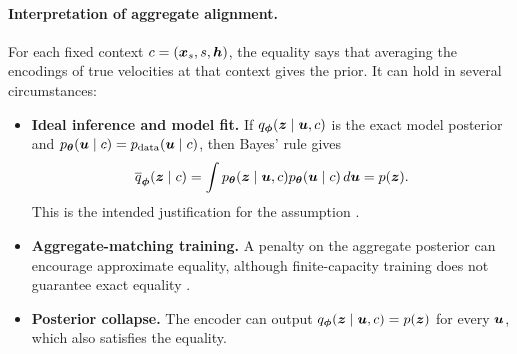 \paragraph{Interpretation of aggregate alignment.}
For each fixed context $c=({\bm{x}}_s,s,{\bm{h}})$, the equality says that averaging
the encodings of true velocities at that context gives the prior. It can hold
in several circumstances:
\begin{itemize}[leftmargin=*,nosep]
  \item \textbf{Ideal inference and model fit.}
  If $q_{\boldsymbol{\phi}}({\bm{z}}\mid{\bm{u}},c)$ is the exact model posterior and
  $p_{{\bm{\theta}}}({\bm{u}}\mid c)=p_{\mathrm{data}}({\bm{u}}\mid c)$, then Bayes' rule
  gives
  \begin{equation*}
    \overline q_{\boldsymbol{\phi}}({\bm{z}}\mid c)
    =
    \int
    p_{{\bm{\theta}}}({\bm{z}}\mid{\bm{u}},c)
    p_{{\bm{\theta}}}({\bm{u}}\mid c)\,d{\bm{u}}
    =
    p({\bm{z}}).
  \end{equation*}
  This is the intended justification for the assumption
  \citep{hoffman2016elbo}.

  \item \textbf{Aggregate-matching training.}
  A penalty on the aggregate posterior can encourage approximate equality,
  although finite-capacity training does not guarantee exact equality
  \citep{tolstikhin2017wasserstein}.

  \item \textbf{Posterior collapse.}
  The encoder can output $q_{\boldsymbol{\phi}}({\bm{z}}\mid{\bm{u}},c)=p({\bm{z}})$ for every ${\bm{u}}$,
  which also satisfies the equality.
\end{itemize}




